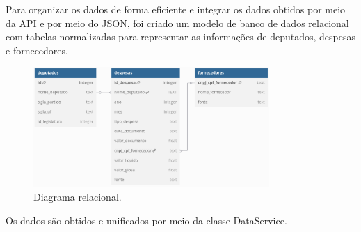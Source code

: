 \documentclass[12pt, a4paper]{article}
\begin{document}
Para organizar os dados de forma eficiente e integrar os dados obtidos por meio da API e por meio do JSON, foi criado um modelo de banco de dados relacional com tabelas normalizadas para representar as informações de deputados, despesas e fornecedores\cite{dbdiagram}.

\begin{figure}[h]
	\centering
	\includegraphics[width=0.8\textwidth]{assets/1_dbdiagram.png}
	\caption{Diagrama relacional.}
	\label{fig:arquivo_json}
\end{figure}

\newpage

Os dados são obtidos e unificados por meio da classe DataService.
\end{document}
